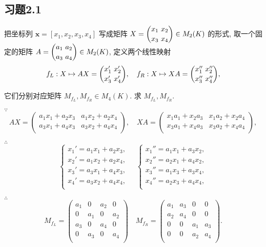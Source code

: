 \documentclass[color=black,device=normal,lang=cn,mode=geye]{elegantnote}
\begin{document}
\subsection{习题2.1}
\begin{exercise}%
    把坐标列 $\boldsymbol{x}=[x_1,x_2,x_3,x_4]$ 写成矩阵 $X=\dbinom{x_1\ x_2}{x_3\ x_4}\in M_2(K)$ 的形式, 取一个固定的矩阵 $A=\dbinom{a_1\ a_2}{a_3\ a_4}\in M_2(K)$, 定义两个线性映射
    \[f_L:X\mapsto AX=\dbinom{x_1'\ x_2'}{x_3'\ x_4'},\quad f_R:X\mapsto XA=\dbinom{x_1''\ x_2''}{x_3''\ x_4''},\]

    它们分别对应矩阵 $M_{f_L},M_{f_R}\in M_4(K)$. 求 $M_{f_L},M_{f_R}$.
\end{exercise}
\begin{solution}
    $\because$
    \[AX=\begin{pmatrix}
        a_1x_1+a_2x_3 & a_1x_2+a_2x_4 \\
        a_3x_1+a_4x_3 & a_3x_2+a_4x_4 \\
    \end{pmatrix},\quad XA=\begin{pmatrix}
        x_1a_1+x_2a_3 & x_1a_2+x_2a_4 \\
        x_3a_1+x_4a_3 & x_3a_2+x_4a_4 \\
    \end{pmatrix},\]

    $\therefore$
    \[\begin{cases}
        x_1'=a_1x_1+a_2x_3, \\
        x_2'=a_1x_2+a_2x_4, \\
        x_3'=a_3x_1+a_4x_3, \\
        x_4'=a_3x_2+a_4x_4, \\
    \end{cases}\quad\begin{cases}
        x_1''=a_1x_1+a_3x_2, \\
        x_2''=a_2x_1+a_4x_2, \\
        x_3''=a_1x_3+a_3x_4, \\
        x_4''=a_2x_3+a_4x_4, \\
    \end{cases}\]

    $\therefore$
    \[M_{f_L}=\begin{pmatrix}
        a_1 & 0   & a_2 & 0   \\
        0   & a_1 & 0   & a_2 \\
        a_3 & 0   & a_4 & 0   \\
        0   & a_3 & 0   & a_4 \\
    \end{pmatrix}\quad M_{f_R}=\begin{pmatrix}
        a_1 & a_3 & 0   & 0   \\
        a_2 & a_4 & 0   & 0   \\
        0   & 0   & a_1 & a_3 \\
        0   & 0   & a_2 & a_4 \\
    \end{pmatrix}.\]
\end{solution}
\end{document}
